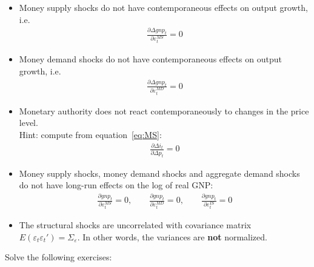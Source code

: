 \begin{itemize}
	\item Money supply shocks do not have contemporaneous effects on output growth, i.e.\
	\begin{align*}
	\frac{\partial \Delta gnp_t}{\partial \varepsilon_t^{MS}}=0
	\end{align*}
	
	\item Money demand shocks do not have contemporaneous effects on output growth, i.e.\
	\begin{align*}
		\frac{\partial \Delta gnp_t}{\partial \varepsilon_t^{MD}}=0	
	\end{align*}
	
	\item Monetary authority does not react contemporaneously to changes in the price level.\\Hint: compute from equation~\eqref{eq:MS}:
	\begin{align*}
		\frac{\partial \Delta i_t}{\partial \Delta p_t}=0	
	\end{align*}
	
	\item Money supply shocks, money demand shocks and aggregate demand shocks do not have long-run effects on the log of real GNP:
	\begin{align*}
		\frac{\partial gnp_t}{\partial \varepsilon_t^{MS}}=0,\qquad \frac{\partial gnp_t}{\partial \varepsilon_t^{MD}}=0,\qquad \frac{\partial gnp_t}{\partial \varepsilon_t^{IS}}=0	
	\end{align*}
	
	\item The structural shocks are uncorrelated with covariance matrix \(E(\varepsilon_t \varepsilon_t')=\Sigma_\varepsilon \).
	In other words, the variances are \textbf{not} normalized.
\end{itemize}
Solve the following exercises:
